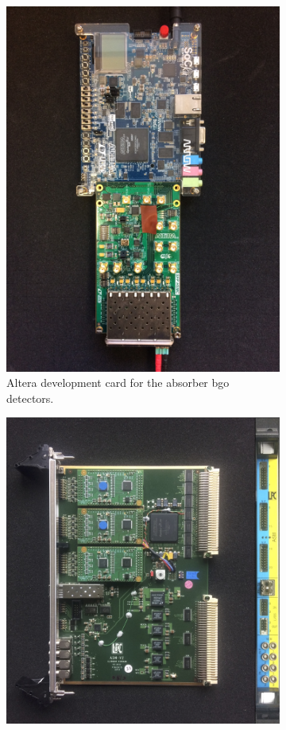 \begin{figure}
\begin{subfigure}[htbp]{0.5\textwidth}
\centering
\includegraphics[width=0.75\linewidth, angle = 90]{03_GraphicFiles/chapter3_CLaRySproto/Absorber/develCard_zoom.jpg}
\caption{Altera development card for the absorber \gls{bgo} detectors.}
\label{chap3::fig::absDevelcard} 
\end{subfigure}
\begin{subfigure}[htbp]{0.5\textwidth}
\centering
\includegraphics[width=\linewidth]{03_GraphicFiles/chapter3_CLaRySproto/Absorber/ASMcard.jpg}

\end{subfigure}
\end{figure}
